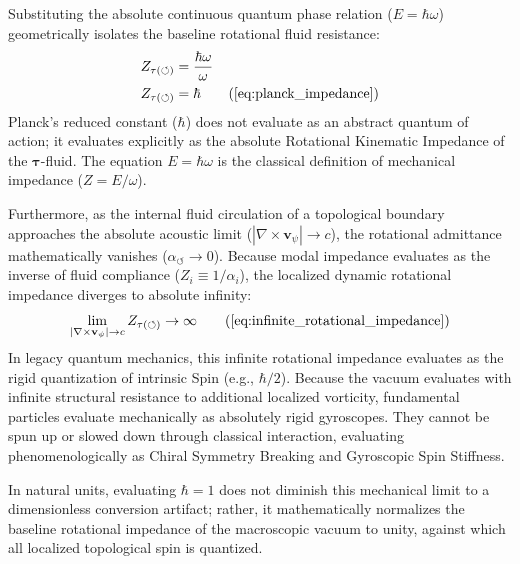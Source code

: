 \documentclass[11pt, a4paper]{article}
\begin{document}
Substituting the absolute continuous quantum phase relation ($E = \hbar\omega$) geometrically isolates the baseline rotational fluid resistance:
\begin{align}
    Z_{\tau(\circlearrowleft)} &= \frac{\hbar\omega}{\omega} \nonumber \\
    Z_{\tau(\circlearrowleft)} &= \hbar \tag{\ref{eq:planck_impedance}}
\end{align}
Planck's reduced constant ($\hbar$) does not evaluate as an abstract quantum of action; it evaluates explicitly as the absolute Rotational Kinematic Impedance of the $\boldsymbol{\tau}$-fluid. The equation $E = \hbar\omega$ is   the classical definition of mechanical impedance ($Z = E/\omega$).

Furthermore, as the internal fluid circulation of a topological boundary approaches the absolute acoustic limit ($|\nabla \times \mathbf{v}_{\psi}| \to c$), the rotational admittance mathematically vanishes ($\alpha_{\circlearrowleft} \to 0$). Because modal impedance evaluates   as the inverse of fluid compliance ($Z_i \equiv 1/\alpha_i$), the localized dynamic rotational impedance diverges to absolute infinity:
\begin{equation}
    \lim_{|\nabla \times \mathbf{v}_{\psi}| \to c} Z_{\tau(\circlearrowleft)} \to \infty \tag{\ref{eq:infinite_rotational_impedance}}
\end{equation}
In legacy quantum mechanics, this infinite rotational impedance evaluates as the rigid quantization of intrinsic Spin (e.g., $\hbar/2$). Because the vacuum evaluates with infinite structural resistance to additional localized vorticity, fundamental particles evaluate mechanically as absolutely rigid gyroscopes. They cannot be spun up or slowed down through classical interaction, evaluating phenomenologically as Chiral Symmetry Breaking and Gyroscopic Spin Stiffness. 

In natural units, evaluating $\hbar = 1$ does not diminish this mechanical limit to a dimensionless conversion artifact; rather, it mathematically normalizes the baseline rotational impedance of the macroscopic vacuum to unity, against which all localized topological spin is quantized.
\end{document}

